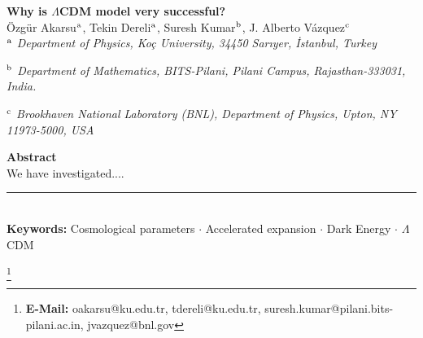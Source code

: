 \documentclass[11pt,a4paper]{article}
\begin{document}
\def\thefootnote{\fnsymbol{footnote}}

\begin{center}
\Large{\textbf{Why is $\Lambda$CDM model very successful?}} \\[0.5cm]

\large{\"{O}zg\"{u}r Akarsu$^{\rm a}$, Tekin Dereli$^{\rm a}$, Suresh Kumar$^{\rm b}$, J. Alberto V\'{a}zquez$^{\rm c}$}
\\[0.5cm]

\small{
\textit{$^{\rm a}$ Department of Physics, Ko\c{c} University, 34450 Sar{\i}yer, {\.I}stanbul, Turkey}}

\vspace{.2cm}


\small{
\textit{$^{\rm b}$ Department of Mathematics, BITS-Pilani, Pilani Campus, Rajasthan-333031, India.}}

\vspace{.2cm}

\small{
\textit{$^{\rm c}$ Brookhaven National Laboratory (BNL), Department of Physics, Upton, NY 11973-5000, USA}}

\end{center}
%
%

\noindent \small{\textbf{Abstract}\\
We have investigated....}
\\
\noindent
\hrule
\noindent \small{\\
\textbf{Keywords:} Cosmological parameters $\cdot$  Accelerated expansion $\cdot$ Dark Energy  $\cdot$ $\Lambda$CDM }
\def\thefootnote{\arabic{footnote}}
\setcounter{footnote}{0}

\let\thefootnote\relax\footnote{\textbf{E-Mail:} oakarsu@ku.edu.tr, tdereli@ku.edu.tr, suresh.kumar@pilani.bits-pilani.ac.in, jvazquez@bnl.gov}

\def\thefootnote{\arabic{footnote}}
\setcounter{footnote}{0}
\end{document}
